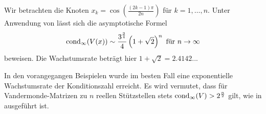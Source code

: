 \begin{example}
    Wir betrachten die Knoten $x_k = \cos \left( \frac{(2k-1) \pi}{2n} \right)$
    für $k=1, \dots, n$.
    Unter Anwendung von  lässt sich die
    asymptotische Formel
    \[
        \cond[\infty]{\Vand{x}} \sim \frac{3^{\frac{3}{4}}}{4} \left( 1 + \sqrt{2} \right)^n \text{ für } n \rightarrow \infty
    \]
    beweisen.
    Die Wachstumsrate beträgt hier $1 + \sqrt{2} = 2.4142..$.
\end{example}

In den vorangegangen Beispielen wurde im besten Fall eine exponentielle
Wachstumsrate der Konditionszahl erreicht.
Es wird vermutet, dass für
Vandermonde-Matrizen zu $n$ reellen Stützstellen stets
$\cond[\infty]{V} > 2^{\frac{n}{2}}$ gilt, wie in \cite[S. 199]{gautschi1}
ausgeführt ist.
